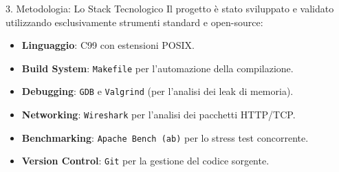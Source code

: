 \documentclass[aspectratio=169, 10pt]{beamer}
\begin{document}
\begin{frame}{3. Metodologia: Lo Stack Tecnologico}
    Il progetto è stato sviluppato e validato utilizzando esclusivamente strumenti standard e open-source:
    
    \begin{itemize}
        \item \textbf{Linguaggio}: C99 con estensioni POSIX.
        \item \textbf{Build System}: \texttt{Makefile} per l'automazione della compilazione.
        \item \textbf{Debugging}: \texttt{GDB} e \texttt{Valgrind} (per l'analisi dei leak di memoria).
        \item \textbf{Networking}: \texttt{Wireshark} per l'analisi dei pacchetti HTTP/TCP.
        \item \textbf{Benchmarking}: \texttt{Apache Bench (ab)} per lo stress test concorrente.
        \item \textbf{Version Control}: \texttt{Git} per la gestione del codice sorgente.
    \end{itemize}
\end{frame}
\end{document}
